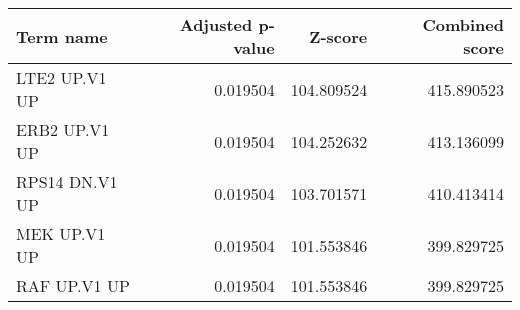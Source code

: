 \begin{tabular}{lrrr}
\toprule
     Term name &  Adjusted p-value &    Z-score &  Combined score \\
\midrule
 LTE2 UP.V1 UP &          0.019504 & 104.809524 &      415.890523 \\
 ERB2 UP.V1 UP &          0.019504 & 104.252632 &      413.136099 \\
RPS14 DN.V1 UP &          0.019504 & 103.701571 &      410.413414 \\
  MEK UP.V1 UP &          0.019504 & 101.553846 &      399.829725 \\
  RAF UP.V1 UP &          0.019504 & 101.553846 &      399.829725 \\
\bottomrule
\end{tabular}
